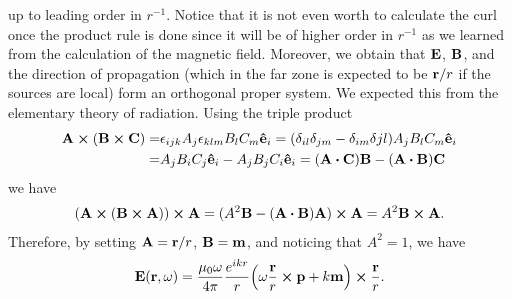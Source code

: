 \documentclass{article}
\begin{document}
\begin{enumerate}[(i)]
up to leading order in $r^{-1}$. Notice that it is not even worth to calculate the curl once the product rule is done since it will be of higher order in $r^{-1}$ as we learned from the calculation of the magnetic field. Moreover, we obtain that $\vb{E}$, $\vb{B}$, and the direction of propagation (which in the far zone is expected to be $\vb{r}/r$ if the sources are local) form an orthogonal proper system. We expected this from the elementary theory of radiation. Using the triple product
\begin{align}
\begin{split}
\vb{A}\cross(\vb{B}\cross\vb{C})=&\epsilon_{ijk}A_j\epsilon_{klm}B_lC_m\vu{e}_i=(\delta_{il}\delta_{jm}-\delta_{im}\delta{jl})A_jB_lC_m\vu{e}_i\\
=&A_jB_iC_j\vu{e}_i-A_jB_jC_i\vu{e}_i=(\vb{A}\vdot\vb{C})\vb{B}-(\vb{A}\vdot\vb{B})\vb{C}
\end{split}
\end{align} 
we have
\begin{align}
\begin{split}
(\vb{A}\cross(\vb{B}\cross\vb{A}))\cross\vb{A}=(A^2\vb{B}-(\vb{A}\vdot\vb{B})\vb{A})\cross\vb{A}=A^2\vb{B}\cross\vb{A}.
\end{split}
\end{align}
Therefore, by setting $\vb{A}=\vb{r}/r$, $\vb{B}=\vb{m}$, and noticing that $A^2=1$, we have
\begin{equation}
\vb{E}(\vb{r},\omega)=\frac{\mu_0\omega}{4\pi}\frac{e^{ikr}}{r}\qty(\omega\frac{\vb{r}}{r}\cross\vb{p}+k\vb{m})\cross\frac{\vb{r}}{r}.
\end{equation}

\end{enumerate}
\end{document}
